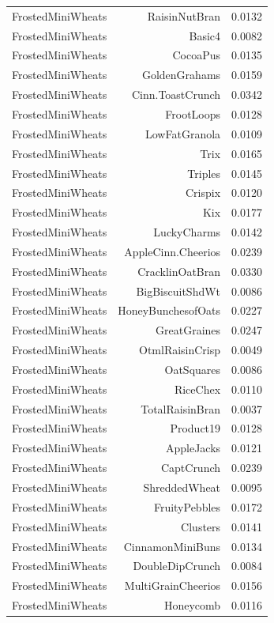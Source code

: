 \begin{longtable}{@{}lrr@{}}
FrostedMiniWheats & RaisinNutBran & 0.0132 \\
FrostedMiniWheats & Basic4 & 0.0082 \\
FrostedMiniWheats & CocoaPus & 0.0135 \\
FrostedMiniWheats & GoldenGrahams & 0.0159 \\
FrostedMiniWheats & Cinn.ToastCrunch & 0.0342 \\
FrostedMiniWheats & FrootLoops & 0.0128 \\
FrostedMiniWheats & LowFatGranola & 0.0109 \\
FrostedMiniWheats & Trix & 0.0165 \\
FrostedMiniWheats & Triples & 0.0145 \\
FrostedMiniWheats & Crispix & 0.0120 \\
FrostedMiniWheats & Kix & 0.0177 \\
FrostedMiniWheats & LuckyCharms & 0.0142 \\
FrostedMiniWheats & AppleCinn.Cheerios & 0.0239 \\
FrostedMiniWheats & CracklinOatBran & 0.0330 \\
FrostedMiniWheats & BigBiscuitShdWt & 0.0086 \\
FrostedMiniWheats & HoneyBunchesofOats & 0.0227 \\
FrostedMiniWheats & GreatGraines & 0.0247 \\
FrostedMiniWheats & OtmlRaisinCrisp & 0.0049 \\
FrostedMiniWheats & OatSquares & 0.0086 \\
FrostedMiniWheats & RiceChex & 0.0110 \\
FrostedMiniWheats & TotalRaisinBran & 0.0037 \\
FrostedMiniWheats & Product19 & 0.0128 \\
FrostedMiniWheats & AppleJacks & 0.0121 \\
FrostedMiniWheats & CaptCrunch & 0.0239 \\
FrostedMiniWheats & ShreddedWheat & 0.0095 \\
FrostedMiniWheats & FruityPebbles & 0.0172 \\
FrostedMiniWheats & Clusters & 0.0141 \\
FrostedMiniWheats & CinnamonMiniBuns & 0.0134 \\
FrostedMiniWheats & DoubleDipCrunch & 0.0084 \\
FrostedMiniWheats & MultiGrainCheerios & 0.0156 \\
FrostedMiniWheats & Honeycomb & 0.0116 \\

\end{longtable}
